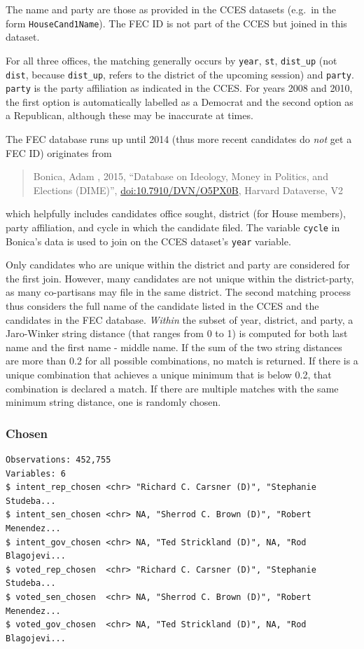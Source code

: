 \documentclass[10pt,article,oneside]{memoir}
\theoremstyle{definition}
\begin{document}
The name and party are those as provided in the CCES datasets (e.g.~in
the form \texttt{HouseCand1Name}). The FEC ID is not part of the CCES
but joined in this dataset.

For all three offices, the matching generally occurs by \texttt{year},
\texttt{st}, \texttt{dist\_up} (not \texttt{dist}, because
\texttt{dist\_up}, refers to the district of the upcoming session) and
\texttt{party}. \texttt{party} is the party affiliation as indicated in
the CCES. For years 2008 and 2010, the first option is automatically
labelled as a Democrat and the second option as a Republican, although
these may be inaccurate at times.

The FEC database runs up until 2014 (thus more recent candidates do
\emph{not} get a FEC ID) originates from

\begin{quote}
Bonica, Adam , 2015, ``Database on Ideology, Money in Politics, and
Elections (DIME)'', \url{doi:10.7910/DVN/O5PX0B}, Harvard Dataverse, V2
\end{quote}

which helpfully includes candidates office sought, district (for House
members), party affiliation, and cycle in which the candidate filed. The
variable \texttt{cycle} in Bonica's data is used to join on the CCES
dataset's \texttt{year} variable.

Only candidates who are unique within the district and party are
considered for the first join. However, many candidates are not unique
within the district-party, as many co-partisans may file in the same
district. The second matching process thus considers the full name of
the candidate listed in the CCES and the candidates in the FEC database.
\emph{Within} the subset of year, district, and party, a Jaro-Winker
string distance (that ranges from 0 to 1) is computed for both last name
and the first name - middle name. If the sum of the two string distances
are more than 0.2 for all possible combinations, no match is returned.
If there is a unique combination that achieves a unique minimum that is
below 0.2, that combination is declared a match. If there are multiple
matches with the same minimum string distance, one is randomly chosen.

\subsubsection{Chosen}\label{chosen}

\begin{verbatim}
Observations: 452,755
Variables: 6
$ intent_rep_chosen <chr> "Richard C. Carsner (D)", "Stephanie Studeba...
$ intent_sen_chosen <chr> NA, "Sherrod C. Brown (D)", "Robert Menendez...
$ intent_gov_chosen <chr> NA, "Ted Strickland (D)", NA, "Rod Blagojevi...
$ voted_rep_chosen  <chr> "Richard C. Carsner (D)", "Stephanie Studeba...
$ voted_sen_chosen  <chr> NA, "Sherrod C. Brown (D)", "Robert Menendez...
$ voted_gov_chosen  <chr> NA, "Ted Strickland (D)", NA, "Rod Blagojevi...
\end{verbatim}
\end{document}
